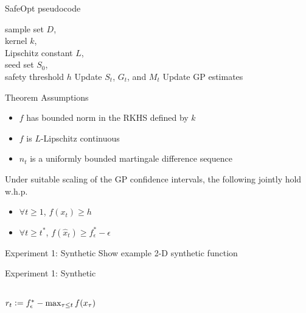 \documentclass[xetex,10pt,mathserif,handout]{beamer}
\newlength\figureheight
\newlength\figurewidth
\newcommand{\defeq}{\vcentcolon=}
\newcommand{\cst}{{\color{cyan!70!black}$S_t$}\xspace}
\newcommand{\cgt}{{\color{lime!70!black}$G_t$}\xspace}
\newcommand{\ccgt}{{\color{lime!70!black}G_t}\xspace}
\newcommand{\cmt}{{\color{orange!70!black}$M_t$}\xspace}
\newcommand{\ccmt}{{\color{orange!70!black}M_t}\xspace}
\begin{document}
\begin{frame}{SafeOpt pseudocode}
\begin{algorithmic}
  \REQUIRE sample set $D$,\\
           \hspace{2.1em}kernel $k$,\\
           \hspace{2.1em}Lipschitz constant $L$,\\
           \hspace{2.1em}seed set $S_0$,\\
           \hspace{2.1em}safety threshold $h$
  \STATE
    \STATE Update \cst, \cgt, and \cmt
    \LET{$x_t$}{$\argmax_{x \in \ccgt \cup \ccmt}(u_t(x) - \ell_t(x))$}
    \STATE Update GP estimates
  \ENDFOR
\end{algorithmic}
\end{frame}

\begin{frame}{Theorem}
Assumptions
\vspace{1em}
\begin{itemize}
  \item $f$ has bounded norm in the RKHS defined by $k$
  \vspace{1em}
  \item $f$ is $L$-Lipschitz continuous
  \vspace{1em}
  \item $n_t$ is a uniformly bounded martingale difference sequence
\end{itemize}
\vspace{2em}
Under suitable scaling of the GP confidence intervals, the following jointly hold w.h.p.
\vspace{1em}
\begin{itemize}
  \item $\forall t \geq 1$, $f(x_t) \geq h$
  \vspace{1em}
  \item $\forall t \geq t^*$, $f(\hat{x}_t) \geq f^*_{\epsilon} - \epsilon$
\end{itemize}
\end{frame}

\begin{frame}{Experiment 1: Synthetic}
Show example 2-D synthetic function
\end{frame}

\begin{frame}{Experiment 1: Synthetic}
\begin{columns}[c]
\centering
$r_t \defeq f^*_{\epsilon} - \max_{\tau \leq t}f(x_{\tau})$\\
\setlength\figurewidth{2.8in}
\setlength\figureheight{4.3in}
\setlength\figurewidth{2.5in}
\setlength\figureheight{3.7in}
\end{columns}
\end{frame}
\end{document}
